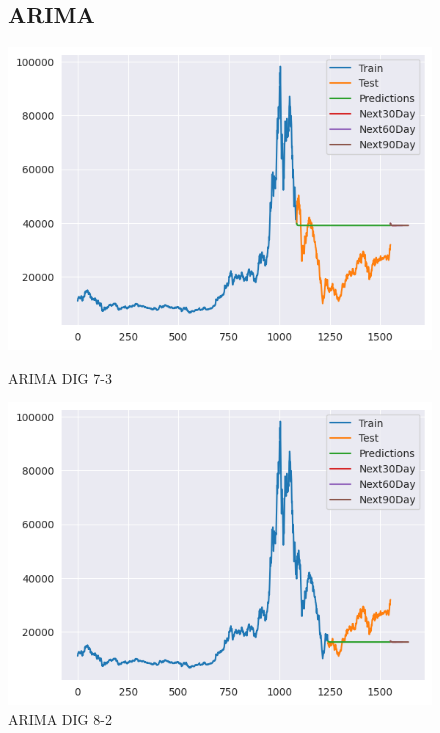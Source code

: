 \documentclass[conference]{IEEEtran}
\begin{document}
\begin{figure}[htbp]
\subsection{ARIMA}
\centering
    \begin{minipage}{0.23\textwidth}
    \centering
    \includegraphics[width=1\textwidth]{experiment/arima/DIG/7 _ 3/7_3_train_test_DIG_ARIMA_plot.png}
    \caption{ARIMA DIG 7-3}
    \label{fig:nvl_boxplot}
    \end{minipage}
    \hfill
    \begin{minipage}{0.23\textwidth}
    \centering
    \includegraphics[width=1\textwidth]{experiment/arima/DIG/8 _ 2/8_2_train_test_DIG_ARIMA_plot.png}
    \caption{ARIMA DIG 8-2}
    \label{fig:nvl_histogram}

\end{minipage}
\end{figure}
\end{document}

